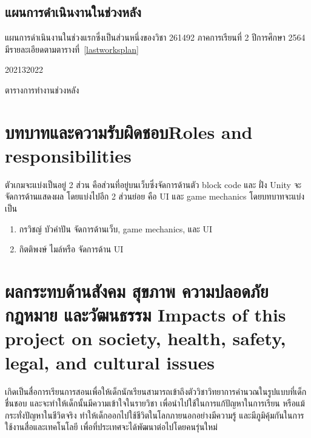 \subsection{แผนการดำเนินงานในช่วงหลัง}
แผนการดำเนินงานในช่วงแรกซึ่งเป็นส่วนหนึ่งของวิชา 261492 ภาคการเรียนที่ 2 ปีการศึกษา 2564 มีรายละเอียดตามตารางที่~\ref{lastworksplan}
\begin{table}
    \begin{plan}{10}{2021}{3}{2022}
    \end{plan}
    \caption[ตารางการทำงานช่วงหลัง]{ตารางการทำงานช่วงหลัง}
    \label{lastworksplan}
\end{table}

\section{\ifcpe บทบาทและความรับผิดชอบ\else Roles and responsibilities\fi}
ตัวเกมจะแบ่งเป็นอยู่ 2 ส่วน คือส่วนที่อยู่บนเว็บซึ่งจัดการด้านตัว block code และ ฝั่ง Unity จะจัดการด้านแสดงผล โดยแบ่งไปอีก
2 ส่วนย่อย คือ UI และ game mechanics โดยบทบาทจะแบ่งเป็น
\begin{enumerate}
    \item กรวิชญ์ บัวคำปัน จัดการด้านเว็บ, game mechanics, และ UI
    \item กิตติพงษ์ ไมล์หรือ จัดการด้าน UI
\end{enumerate}

\section{\ifcpe%
ผลกระทบด้านสังคม สุขภาพ ความปลอดภัย กฎหมาย และวัฒนธรรม
\else%
Impacts of this project on society, health, safety, legal, and cultural issues
\fi}

เกิดเป็นสื่อการเรียนการสอนเพื่อให้เด็กนักเรียนสามารถเข้าถึงตัววิชาวิทยาการคำนวณในรูปแบบที่เด็กชื่นชอบ และจะทำให้เด็กนั้นมีความเข้าใจในรายวิชา เพื่อนำไปใช้ในการแก้ปัญหาในการเรียน หรือแม้กระทั่งปัญหาในชีวิตจริง ทำให้เด็กออกไปใช้ชีวิตในโลกภายนอกอย่างมีความรู้ และมีภูมิคุ้มกันในการใช้งานสื่อและเทคโนโลยี เพื่อที่ประเทศจะได้พัฒนาต่อไปโดยคนรุ่นใหม่
